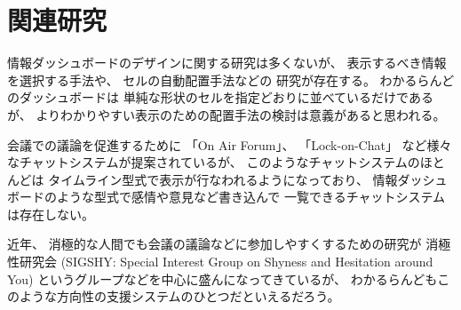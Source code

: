 \section{関連研究}

情報ダッシュボードのデザイン\cite{few}に関する研究は多くないが、
表示するべき情報を選択する手法\cite{Jones:2015:ECI:2800835.2800963}や、
セルの自動配置手法\cite{Hertzog:2015:BSP:2678025.2701383}などの
研究が存在する。
わかるらんどのダッシュボードは
単純な形状のセルを指定どおりに並べているだけであるが、
よりわかりやすい表示のための配置手法の検討は意義があると思われる。

会議での議論を促進するために
「On Air Forum」\cite{nishida2011}、
「Lock-on-Chat」\cite{nishida2006}
など様々なチャットシステムが提案されているが、
このようなチャットシステムのほとんどは
タイムライン型式で表示が行なわれるようになっており、
情報ダッシュボードのような型式で感情や意見など書き込んで
一覧できるチャットシステムは存在しない。

近年、
消極的な人間でも会議の議論などに参加しやすくするための研究が
消極性研究会 (SIGSHY: Special Interest Group on Shyness and Hesitation around You)
というグループなどを中心に盛んになってきているが\cite{kurihara2016}\cite{nishida2011}、
わかるらんどもこのような方向性の支援システムのひとつだといえるだろう。

% 
% 
% 
